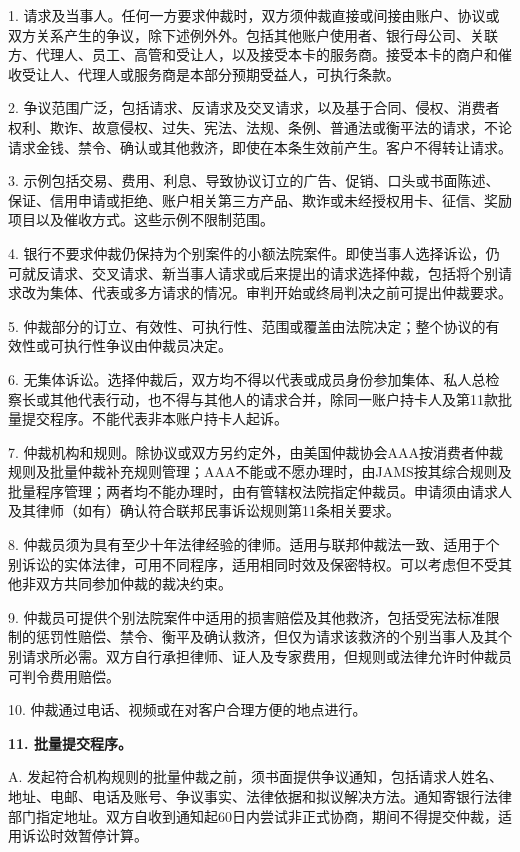\documentclass[UTF8,fontset=none,11pt,a4paper]{ctexart}
\begin{document}
1. 请求及当事人。任何一方要求仲裁时，双方须仲裁直接或间接由账户、协议或双方关系产生的争议，除下述例外外。包括其他账户使用者、银行母公司、关联方、代理人、员工、高管和受让人，以及接受本卡的服务商。接受本卡的商户和催收受让人、代理人或服务商是本部分预期受益人，可\allowbreak\mbox{执行条款。}


2. 争议范围广泛，包括请求、反请求及交叉请求，以及基于合同、侵权、消费者权利、欺诈、故意侵权、过失、宪法、法规、条例、普通法或衡平法的请求，不论请求金钱、禁令、确认或其他救济，即使在本条生效前产生。客户不得\allowbreak\mbox{转让请求。}


3. 示例包括交易、费用、利息、导致协议订立的广告、促销、口头或书面陈述、保证、信用申请或拒绝、账户相关第三方产品、欺诈或未经授权用卡、征信、奖励项目以及催收方式。这些示例不\allowbreak\mbox{限制范围。}


4. 银行不要求仲裁仍保持为个别案件的小额法院案件。即使当事人选择诉讼，仍可就反请求、交叉请求、新当事人请求或后来提出的请求选择仲裁，包括将个别请求改为集体、代表或多方请求的情况。审判开始或终局判决之前可提出\allowbreak\mbox{仲裁要求。}


5. 仲裁部分的订立、有效性、可执行性、范围或覆盖由法院决定；整个协议的有效性或可执行性争议由仲\allowbreak\mbox{裁员决定。}


6. 无集体诉讼。选择仲裁后，双方均不得以代表或成员身份参加集体、私人总检察长或其他代表行动，也不得与其他人的请求合并，除同一账户持卡人及第11款批量提交程序。不能代表非本账户持\allowbreak\mbox{卡人起诉。}


7. 仲裁机构和规则。除协议或双方另约定外，由美国仲裁协会AAA按消费者仲裁规则及批量仲裁补充规则管理；AAA不能或不愿办理时，由JAMS按其综合规则及批量程序管理；两者均不能办理时，由有管辖权法院指定仲裁员。申请须由请求人及其律师（如有）确认符合联邦民事诉讼规则第11条\allowbreak\mbox{相关要求。}


8. 仲裁员须为具有至少十年法律经验的律师。适用与联邦仲裁法一致、适用于个别诉讼的实体法律，可用不同程序，适用相同时效及保密特权。可以考虑但不受其他非双方共同参加仲裁的\allowbreak\mbox{裁决约束。}


9. 仲裁员可提供个别法院案件中适用的损害赔偿及其他救济，包括受宪法标准限制的惩罚性赔偿、禁令、衡平及确认救济，但仅为请求该救济的个别当事人及其个别请求所必需。双方自行承担律师、证人及专家费用，但规则或法律允许时仲裁员可判令\allowbreak\mbox{费用赔偿。}


10. 仲裁通过电话、视频或在对客户合理方便的\allowbreak\mbox{地点进行。}


\textbf{11. 批量提交程序。}


A. 发起符合机构规则的批量仲裁之前，须书面提供争议通知，包括请求人姓名、地址、电邮、电话及账号、争议事实、法律依据和拟议解决方法。通知寄银行法律部门指定地址。双方自收到通知起60日内尝试非正式协商，期间不得提交仲裁，适用诉讼时效\allowbreak\mbox{暂停计算。}
\end{document}
